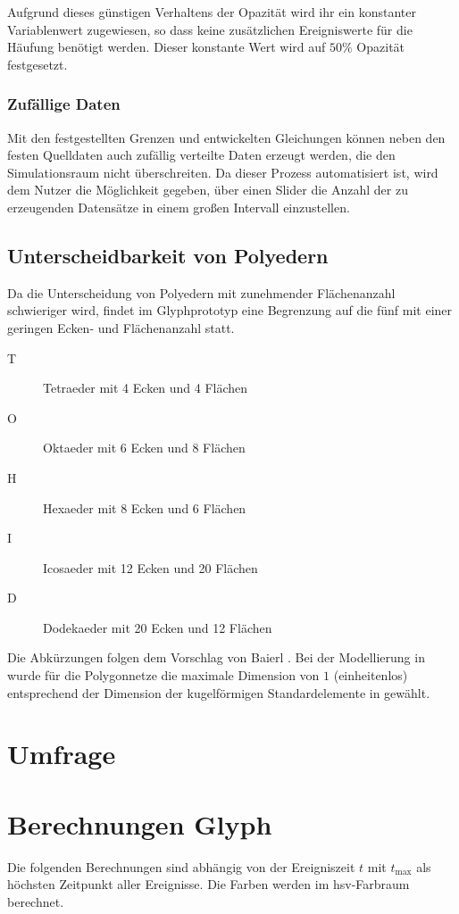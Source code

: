 Aufgrund dieses günstigen Verhaltens der Opazität wird ihr ein konstanter Variablenwert zugewiesen, so dass keine zusätzlichen Ereigniswerte für die Häufung benötigt werden. Dieser konstante Wert wird auf $50\%$ Opazität festgesetzt.

\subsubsection*{Zufällige Daten}
Mit den festgestellten Grenzen und entwickelten Gleichungen können neben den festen Quelldaten auch zufällig verteilte Daten erzeugt werden, die den Simulationsraum nicht überschreiten. Da dieser Prozess automatisiert ist, wird dem Nutzer die Möglichkeit gegeben, über einen Slider die Anzahl der zu erzeugenden Datensätze in einem großen Intervall einzustellen.

\subsection*{Unterscheidbarkeit von Polyedern}\label{sec:polyeder}
Da die Unterscheidung von Polyedern mit zunehmender Flächenanzahl schwieriger wird, findet im Glyphprototyp eine Begrenzung auf die fünf  mit einer geringen Ecken- und Flächenanzahl statt.
\begin{description}
	\item[T] Tetraeder mit 4 Ecken und 4 Flächen
	\item[O] Oktaeder mit 6 Ecken und 8 Flächen
	\item[H] Hexaeder mit 8 Ecken und 6 Flächen
	\item[I] Icosaeder mit 12 Ecken und 20 Flächen
	\item[D] Dodekaeder mit 20 Ecken und 12 Flächen
\end{description}
Die Abkürzungen folgen dem Vorschlag von Baierl \cite[S.~42]{KonvexePolyeder}. Bei der Modellierung in  wurde für die Polygonnetze die maximale Dimension von $1$ (einheitenlos) entsprechend der Dimension der kugelförmigen Standardelemente in  gewählt.

\section{Umfrage}



\section{Berechnungen Glyph}\label{sec:berechnungen:glyph}
Die folgenden Berechnungen sind abhängig von der Ereigniszeit $t$ mit $t_{\text{max}}$ als höchsten Zeitpunkt aller Ereignisse. Die Farben werden im \gls{hsv}-Farbraum berechnet.

